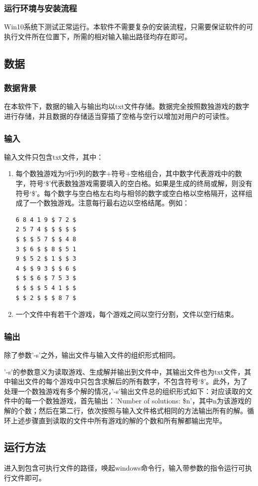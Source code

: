 \documentclass[a4paper]{article}
\begin{document}
\subsubsection{运行环境与安装流程}
Win10系统下测试正常运行。本软件不需要复杂的安装流程，只需要保证软件的可执行文件所在位置下，所需的相对输入输出路径均存在即可。
\subsection{数据}
\subsubsection{数据背景}
在本软件下，数据的输入与输出均以txt文件存储。数据完全按照数独游戏的数字进行存储，并且数据的存储适当穿插了空格与空行以增加对用户的可读性。
\subsubsection{输入}
输入文件只包含txt文件，其中：
\begin{enumerate}
\item 每个数独游戏为9行9列的数字+符号+空格组合，其中数字代表游戏中的数字，符号‘\$’代表数独游戏需要填入的空白格。如果是生成的终局或解，则没有符号‘\$’。每个数字与空白格左右均与相邻的数字或空白格以空格隔开，这样组成了一个数独游戏。注意每行最右边以空格结尾。例如：
\begin{lstlisting}
6 8 4 1 9 $ 7 2 $ 
2 5 7 4 $ $ $ $ $ 
$ $ $ 5 7 $ $ 4 8 
3 $ 6 $ $ 8 $ 5 1 
9 $ 5 2 $ 1 $ $ 3 
4 $ $ 9 3 $ $ 6 $ 
$ $ $ 6 $ 7 5 3 $ 
$ $ $ $ 5 4 1 $ $ 
$ $ 2 $ $ $ 8 7 $
\end{lstlisting}
\item 一个文件中有若干个游戏，每个游戏之间以空行分割，文件以空行结束。
\end{enumerate}
\subsubsection{输出}
除了参数'-s'之外，输出文件与输入文件的组织形式相同。
\par
'-s'的参数意义为读取游戏、生成解并输出到文件中，其输出文件也为txt文件，其中输出文件的每个游戏中只包含求解后的所有数字，不包含符号‘\$’。此外，为了处理一个数独游戏有多个解的情况，'-s'输出文件总的组织形式如下：对应读取的文件中的每一个数独游戏，首先输出：'Number of solutions: \$n'，其中n为该游戏的解的个数；然后在第二行，依次按照与输入文件格式相同的方法输出所有的解。循环上述步骤直到读取的文件中所有游戏的解的个数和所有解都输出完毕。
\subsection{运行方法}
进入到包含可执行文件的路径，唤起windows命令行，输入带参数的指令运行可执行文件即可。
\end{document}
